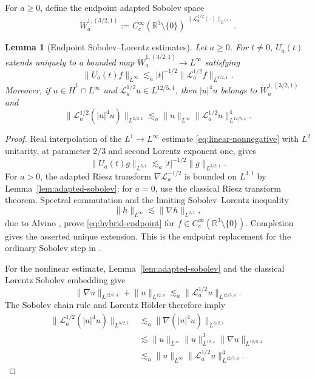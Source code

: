 \documentclass[preprint,12pt]{elsarticle}
\numberwithin{equation}{section}
\newtheorem{lemma}{Lemma}[section]
\theoremstyle{definition}
\theoremstyle{remark}
\newcommand{\R}{\mathbb R}
\newcommand{\cL}{\mathcal L}
\newcommand{\norm}[2]{\lVert #1\rVert_{#2}}
\begin{document}
For $a\geq0$, define the endpoint adapted Sobolev space
\[
 \dot W_a^{1,(3/2,1)}
 :=\overline{C_c^\infty(\R^3\setminus\{0\})}^{\,
 \norm{\cL_a^{1/2}(\cdot)}{L^{3/2,1}}}.
\]


\begin{lemma}[Endpoint Sobolev--Lorentz estimates]
\label{lem:nonnegative-endpoint-tools}
Let $a\geq0$. For $t\neq0$, $U_a(t)$ extends uniquely to a bounded map
$\dot W_a^{1,(3/2,1)}\to L^\infty$ satisfying
\begin{equation}
 \norm{U_a(t)f}{L^\infty}
 \lesssim_a |t|^{-1/2}
 \norm{\cL_a^{1/2}f}{L^{3/2,1}}.
 \label{eq:hybrid-endpoint}
\end{equation}
Moreover, if $u\in\dot H^1\cap L^\infty$ and
$\cL_a^{1/2}u\in L^{12/5,4}$, then $|u|^4u$ belongs to
$\dot W_a^{1,(3/2,1)}$ and
\begin{equation}
 \norm{\cL_a^{1/2}(|u|^4u)}{L^{3/2,1}}
 \lesssim_a
 \norm{u}{L^\infty}
 \norm{\cL_a^{1/2}u}{L^{12/5,4}}^4.
 \label{eq:quintic-endpoint}
\end{equation}
\end{lemma}

\begin{proof}
Real interpolation of the $L^1\to L^\infty$ estimate
\eqref{eq:linear-nonnegative} with $L^2$ unitarity, at parameter
$2/3$ and second Lorentz exponent one, gives
\[
 \norm{U_a(t)g}{L^{3,1}}
 \lesssim_a |t|^{-1/2}\norm{g}{L^{3/2,1}}.
\]
For $a>0$, the adapted Riesz transform
$\nabla\cL_a^{-1/2}$ is bounded on $L^{3,1}$ by
Lemma~\ref{lem:adapted-sobolev}; for $a=0$, use the classical Riesz
transform theorem. Spectral commutation and the limiting
Sobolev--Lorentz inequality
\[
 \norm{h}{L^\infty}\lesssim\norm{\nabla h}{L^{3,1}},
\]
due to Alvino \cite{Alvino}, prove \eqref{eq:hybrid-endpoint} for
$f\in C_c^\infty(\R^3\setminus\{0\})$. Completion gives the asserted
unique extension. This is
the endpoint replacement for the ordinary Sobolev step in
\cite[Section~4.2]{WangXuZhang}.

For the nonlinear estimate, Lemma~\ref{lem:adapted-sobolev} and the
classical Lorentz Sobolev embedding give
\[
 \norm{\nabla u}{L^{12/5,4}}+\norm{u}{L^{12,4}}
 \lesssim_a\norm{\cL_a^{1/2}u}{L^{12/5,4}}.
\]
The Sobolev chain rule
\cite[Theorem~2.1.11]{Ziemer} and Lorentz H\"older therefore imply
\[
 \begin{split}
 \norm{\cL_a^{1/2}(|u|^4u)}{L^{3/2,1}}
 &\lesssim_a\norm{\nabla(|u|^4u)}{L^{3/2,1}}\\
 &\lesssim
 \norm{u}{L^\infty}\norm{u}{L^{12,4}}^3
 \norm{\nabla u}{L^{12/5,4}}\\
 & \lesssim_a
 \norm{u}{L^\infty}
 \norm{\cL_a^{1/2}u}{L^{12/5,4}}^4.
 \end{split}
\]
\end{proof}
\end{document}
